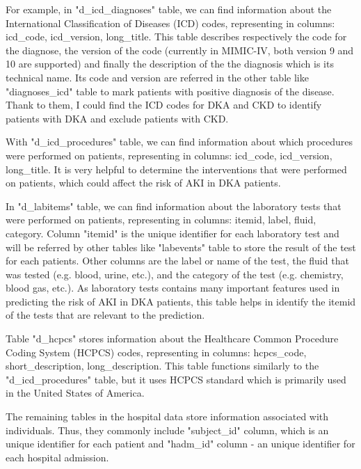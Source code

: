 \documentclass[../main.tex]{subfiles}
\begin{document}
For example, in "d\_icd\_diagnoses" table, we can find information about the International Classification of Diseases (ICD) codes, representing in columns: icd\_code, icd\_version, long\_title.
This table describes respectively the code for the diagnose, the version of the code (currently in MIMIC-IV, both version 9 and 10 are supported) and finally the description of the the diagnosis which is its technical name.
Its code and version are referred in the other table like "diagnoses\_icd" table to mark patients with positive diagnosis of the disease.
Thank to them, I could find the ICD codes for DKA and CKD to identify patients with DKA and exclude patients with CKD.

With "d\_icd\_procedures" table, we can find information about which procedures were performed on patients, representing in columns: icd\_code, icd\_version, long\_title.
It is very helpful to determine the interventions that were performed on patients, which could affect the risk of AKI in DKA patients.

In "d\_labitems" table, we can find information about the laboratory tests that were performed on patients, representing in columns: itemid, label, fluid, category. Column "itemid" is the unique identifier for each laboratory test and will be referred by other tables like "labevents" table to store the result of the test for each patients. Other columns are the label or name of the test, the fluid that was tested (e.g. blood, urine, etc.), and the category of the test (e.g. chemistry, blood gas, etc.).
As laboratory tests contains many important features used in predicting the risk of AKI in DKA patients, this table helps in identify the itemid of the tests that are relevant to the prediction.

Table "d\_hcpcs" stores information about the Healthcare Common Procedure Coding System (HCPCS) codes, representing in columns: hcpcs\_code, short\_description, long\_description.
This table functions similarly to the "d\_icd\_procedures" table, but it uses HCPCS standard which is primarily used in the United States of America.

The remaining tables in the hospital data store information associated with individuals.
Thus, they commonly include "subject\_id" column, which is an unique identifier for each patient and "hadm\_id" column - an unique identifier for each hospital admission.
\end{document}
